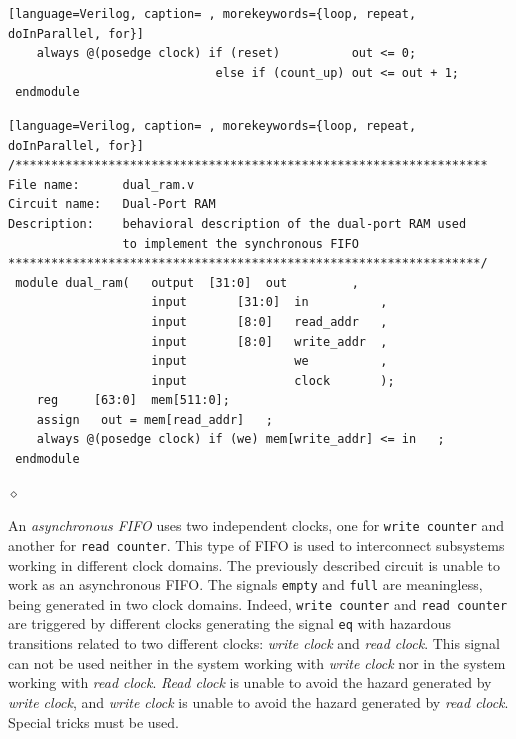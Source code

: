\begin{simulation}
{{\begin{shaded*}
\begin{lstlisting}[language=Verilog, caption= , morekeywords={loop, repeat, doInParallel, for}]
    always @(posedge clock) if (reset)          out <= 0;
                             else if (count_up) out <= out + 1;
 endmodule
\end{lstlisting}
\end{shaded*}
}
}

\pagebreak

{\small
{\em
\begin{shaded*}
\begin{lstlisting}[language=Verilog, caption= , morekeywords={loop, repeat, doInParallel, for}]
/******************************************************************
File name:      dual_ram.v
Circuit name:   Dual-Port RAM
Description:    behavioral description of the dual-port RAM used 
                to implement the synchronous FIFO
******************************************************************/
 module dual_ram(   output  [31:0]  out         ,
                    input       [31:0]  in          ,
                    input       [8:0]   read_addr   ,
                    input       [8:0]   write_addr  ,
                    input               we          ,
                    input               clock       );
    reg     [63:0]  mem[511:0];
    assign   out = mem[read_addr]   ;
    always @(posedge clock) if (we) mem[write_addr] <= in   ;
 endmodule
\end{lstlisting}
\end{shaded*}
}
}
 $\diamond$
\end{simulation}

An {\em asynchronous FIFO} uses two independent clocks, one for
{\tt write counter} and another for {\tt read counter}. This type
of FIFO is used to interconnect subsystems working in different
clock domains. The previously described circuit is unable to work
as an asynchronous FIFO. The signals {\tt empty} and {\tt full}
are meaningless, being generated in two clock domains. Indeed,
{\tt write counter} and {\tt read counter} are triggered by
different clocks generating the signal {\tt eq} with hazardous
transitions related to two different clocks: {\em write clock} and
{\em read clock}. This signal can not be used neither in the
system working with {\em write clock} nor in the system working
with {\em read clock}. {\em Read clock} is unable to avoid the
hazard generated by {\em write clock}, and {\em write clock} is
unable to avoid the hazard generated by {\em read clock}. Special
tricks must be used.
